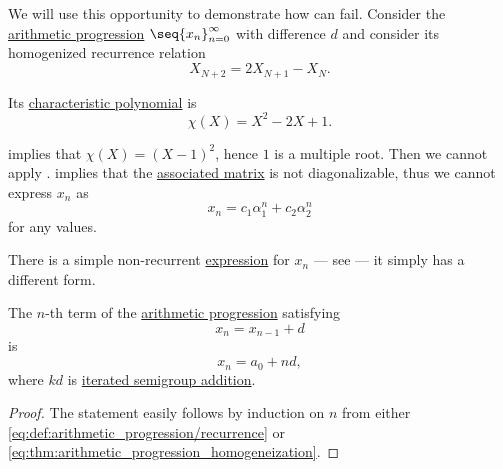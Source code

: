 \begin{example}\label{ex:arithmetic_progression_unwinding_as_recurrence}
  We will use this opportunity to demonstrate how  can fail. Consider the \hyperref[def:arithmetic_progression]{arithmetic progression} \( \seq{ x_n }_{n=0}^\infty \) with difference \( d \) and consider its homogenized recurrence relation
  \begin{equation*}
    X_{N+2} = 2 X_{N+1} - X_N.
  \end{equation*}

  Its \hyperref[def:linear_recurrence_characteristic_polynomial]{characteristic polynomial} is
  \begin{equation*}
    \chi(X) = X^2 - 2 X + 1.
  \end{equation*}

   implies that \( \chi(X) = (X - 1)^2 \), hence \( 1 \) is a multiple root. Then we cannot apply .  implies that the \hyperref[def:homogeneous_linear_recurrence_matrix]{associated matrix} is not diagonalizable, thus we cannot express \( x_n \) as
  \begin{equation*}
    x_n = c_1 \alpha_1^n + c_2 \alpha_2^n
  \end{equation*}
  for any values.

  There is a simple non-recurrent \hyperref[con:expression]{expression}  for \( x_n \) --- see  --- it simply has a different form.
\end{example}

\begin{proposition}\label{thm:arithmetic_progression_unwinding}
  The \( n \)-th term of the \hyperref[def:arithmetic_progression]{arithmetic progression} satisfying
  \begin{equation*}
    x_n = x_{n-1} + d
  \end{equation*}
  is
  \begin{equation*}
    x_n = a_0 + nd,
  \end{equation*}
  where \( kd \) is \hyperref[con:additive_semigroup/multiplication]{iterated semigroup addition}.
\end{proposition}
\begin{proof}
  The statement easily follows by induction on \( n \) from either \eqref{eq:def:arithmetic_progression/recurrence} or \eqref{eq:thm:arithmetic_progression_homogeneization}.
\end{proof}

